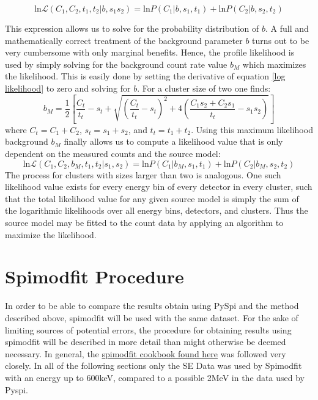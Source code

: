 \documentclass{article}
\begin{document}
\begin{equation}\label{log likelihood}
    \text{ln}\mathcal{L}(C_1, C_2, t_1, t_2\vert b, s_1 s_2) = \text{ln}P(C_1 \vert b, s_1, t_1) + \text{ln}P(C_2 \vert b, s_2, t_2)
\end{equation}

This expression allows us to solve for the probability distribution of $b$. A full and mathematically correct treatment of the background parameter $b$ turns out to be very cumbersome with only marginal benefits. Hence, the profile likelihood is used by simply solving for the background count rate value $b_M$ which maximizes the likelihood. This is easily done by setting the derivative of equation \ref{log likelihood} to zero and solving for $b$. For a cluster size of two one finds:
\begin{equation}
    b_M = \frac{1}{2} \left[ \frac{C_t}{t_t} - s_t + \sqrt{\left( \frac{C_t}{t_t} - s_t\right)^2 + 4 \left( \frac{C_1s_2+C_2s_1}{t_t}-s_1s_2\right)}\right]
\end{equation}
where $C_t=C_1+C_2$, $s_t=s_1+s_2$, and $t_t=t_1+t_2$. Using this maximum likelihood background $b_M$ finally allows us to compute a likelihood value that is only dependent on the measured counts and the source model:
\begin{equation}
    \text{ln}\mathcal{L}(C_1, C_2, b_M, t_1, t_2 \vert s_1, s_2) = \text{ln}P(C_1 \vert b_M, s_1, t_1) + \text{ln}P(C_2 \vert b_M, s_2, t_2)
\end{equation}
The process for clusters with sizes larger than two is analogous. One such likelihood value exists for every energy bin of every detector in every cluster, such that the total likelihood value for any given source model is simply the sum of the logarithmic likelihoods over all energy bins, detectors, and clusters. Thus the source model may be fitted to the count data by applying an algorithm to maximize the likelihood.


\section{Spimodfit Procedure}
In order to be able to compare the results obtain using PySpi and the method described above, spimodfit will be used with the same dataset. For the sake of limiting sources of potential errors, the procedure for obtaining results using spimodfit will be described in more detail than might otherwise be deemed necessary. In general, the  \href{https://www-cms.mpe.mpg.de/gamma/instruments/integral/www/}{spimodfit cookbook found here} was followed very closely. In all of the following sections only the SE Data was used by Spimodfit with an energy up to 600keV, compared to a possible 2MeV in the data used by Pyspi. 
\end{document}
